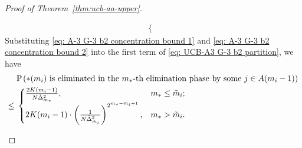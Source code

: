\documentclass[
  12pt]{article}
\begin{document}
\begin{proof}[Proof of Theorem~\ref{thm:ucb-aa-upper}]
\begin{itemize}
\begin{align}
\begin{cases}
\end{cases}
\label{eq: A-3 G-3 b2 concentration bound 2}
\end{align}
Substituting \eqref{eq: A-3 G-3 b2 concentration bound 1} and \eqref{eq: A-3 G-3 b2 concentration bound 2} into the first term of \eqref{eq: UCB-A3 G-3 b2 partition}, we have 
\begin{align}
    &\;\mathbb{P}\left(\text{$*(m_i)$ is eliminated in the $m_*$-th elimination phase } \text{by some }j\in A(m_i-1)\right)\notag \\
    \leq & \;\begin{cases}
    \frac{2K(m_i-1)}{N\tilde{\Delta}_{m_*}^2}, & m_* \leq \tilde{m}_i;\\
    2K(m_i-1)\cdot \left(\frac{1}{N\tilde{\Delta}_{\tilde{m}_i}^2}\right)^{2^{m_*-\tilde{m}_i+1}}, & m_*>\tilde{m}_i.
\end{cases}
\label{eq: UCB-A3 G-3 b2 partition term 1}
\end{align}


\end{itemize}
\end{proof}
\end{document}
